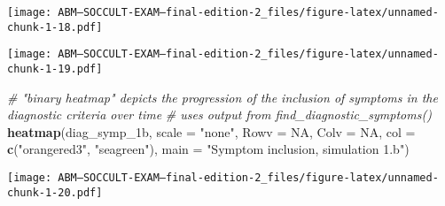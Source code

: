 \documentclass[]{article}
\newenvironment{Shaded}{\begin{snugshade}}{\end{snugshade}}
\newcommand{\KeywordTok}[1]{\textcolor[rgb]{0.13,0.29,0.53}{\textbf{#1}}}
\newcommand{\DataTypeTok}[1]{\textcolor[rgb]{0.13,0.29,0.53}{#1}}
\newcommand{\DecValTok}[1]{\textcolor[rgb]{0.00,0.00,0.81}{#1}}
\newcommand{\StringTok}[1]{\textcolor[rgb]{0.31,0.60,0.02}{#1}}
\newcommand{\CommentTok}[1]{\textcolor[rgb]{0.56,0.35,0.01}{\textit{#1}}}
\newcommand{\OtherTok}[1]{\textcolor[rgb]{0.56,0.35,0.01}{#1}}
\newcommand{\OperatorTok}[1]{\textcolor[rgb]{0.81,0.36,0.00}{\textbf{#1}}}
\newcommand{\NormalTok}[1]{#1}
\begin{document}
\texttt{[image: ABM---SOCCULT-EXAM---final-edition-2\_files/figure-latex/unnamed-chunk-1-18.pdf]}

\begin{Shaded}
\end{Shaded}

\texttt{[image: ABM---SOCCULT-EXAM---final-edition-2\_files/figure-latex/unnamed-chunk-1-19.pdf]}

\begin{Shaded}
\begin{Highlighting}[]
\CommentTok{# "binary heatmap" depicts the progression of the inclusion of symptoms in the diagnostic criteria over time}
\CommentTok{# uses output from find_diagnostic_symptoms()}
\KeywordTok{heatmap}\NormalTok{(diag_symp_1b, }\DataTypeTok{scale =} \StringTok{"none"}\NormalTok{, }\DataTypeTok{Rowv =} \OtherTok{NA}\NormalTok{, }\DataTypeTok{Colv =} \OtherTok{NA}\NormalTok{, }\DataTypeTok{col =} \KeywordTok{c}\NormalTok{(}\StringTok{"orangered3"}\NormalTok{, }\StringTok{"seagreen"}\NormalTok{), }\DataTypeTok{main =} \StringTok{"Symptom inclusion, simulation 1.b"}\NormalTok{) }
\end{Highlighting}
\end{Shaded}

\texttt{[image: ABM---SOCCULT-EXAM---final-edition-2\_files/figure-latex/unnamed-chunk-1-20.pdf]}
\end{document}
